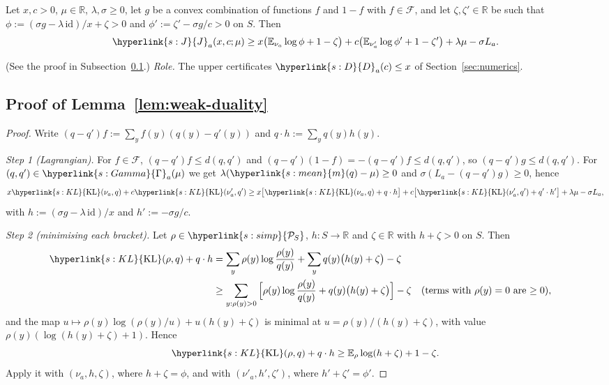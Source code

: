 \documentclass[11pt]{article}
\newcommand{\E}{\mathbb{E}}
\newcommand{\sy}[2]{{\hyperlink{#1}{#2}}}
\newcommand{\Simp}{\sy{s:simp}{\mathcal{P}_{S}}}
\newcommand{\mean}{\sy{s:mean}{m}}
\newcommand{\KL}{\sy{s:KL}{\mathrm{KL}}}
\newcommand{\Pairs}{\sy{s:Gamma}{\Gamma}}
\newcommand{\Jf}{\sy{s:J}{J}}
\newcommand{\Dc}{\sy{s:D}{D}}
\begin{document}
\begin{lemma}\label{lem:weak-duality}
Let $x,c>0$, $\mu\in\mathbb R$, $\lambda,\sigma\ge0$, let $g$ be a convex combination of functions
$f$ and $1-f$ with $f\in\mathcal F$, and let $\zeta,\zeta'\in\mathbb R$ be such that
$\phi:=(\sigma g-\lambda\,\mathrm{id})/x+\zeta>0$ and $\phi':=\zeta'-\sigma g/c>0$ on $S$. Then
\begin{equation*}
\Jf_a(x,c;\mu)\ge x\big(\E_{\nu_a}\log\phi+1-\zeta\big)+c\big(\E_{\nu'_a}\log\phi'+1-\zeta'\big)+\lambda\mu-\sigma L_a .
\end{equation*}
\end{lemma}

(See the proof in Subsection~\ref{sec:proof-lem-weak-duality}.) \emph{Role.} The upper certificates
$\Dc_a(c)\le x$ of Section~\ref{sec:numerics}.

\subsection{Proof of Lemma~\ref{lem:weak-duality}}\label{sec:proof-lem-weak-duality}

\begin{proof}
Write $(q-q')f:=\sum_yf(y)(q(y)-q'(y))$ and $q\cdot h:=\sum_yq(y)h(y)$.

\emph{Step 1 (Lagrangian).} For $f\in\mathcal F$, $(q-q')f\le d(q,q')$ and
$(q-q')(1-f)=-(q-q')f\le d(q,q')$, so $(q-q')g\le d(q,q')$. For $(q,q')\in\Pairs_a(\mu)$ we get
$\lambda(\mean(q)-\mu)\ge0$ and $\sigma(L_a-(q-q')g)\ge0$, hence
\begin{equation*}
x\KL(\nu_a,q)+c\KL(\nu'_a,q')\ge x\big[\KL(\nu_a,q)+q\cdot h\big]+c\big[\KL(\nu'_a,q')+q'\cdot h'\big]+\lambda\mu-\sigma L_a,
\end{equation*}
with $h:=(\sigma g-\lambda\,\mathrm{id})/x$ and $h':=-\sigma g/c$.

\emph{Step 2 (minimising each bracket).} Let $\rho\in\Simp$, $h:S\to\mathbb R$ and $\zeta\in\mathbb R$
with $h+\zeta>0$ on $S$. Then
\begin{align*}
\KL(\rho,q)+q\cdot h&=\sum_y\rho(y)\log\frac{\rho(y)}{q(y)}+\sum_yq(y)\big(h(y)+\zeta\big)-\zeta\\
&\ge\sum_{y:\rho(y)>0}\Big[\rho(y)\log\frac{\rho(y)}{q(y)}+q(y)\big(h(y)+\zeta\big)\Big]-\zeta
&& \text{(terms with $\rho(y)=0$ are $\ge0$)},
\end{align*}
and the map $u\mapsto\rho(y)\log(\rho(y)/u)+u(h(y)+\zeta)$ is minimal at $u=\rho(y)/(h(y)+\zeta)$,
with value $\rho(y)(\log(h(y)+\zeta)+1)$. Hence
\begin{equation*}
\KL(\rho,q)+q\cdot h\ge\E_\rho\log(h+\zeta)+1-\zeta .
\end{equation*}
Apply it with $(\nu_a,h,\zeta)$, where $h+\zeta=\phi$, and with $(\nu'_a,h',\zeta')$, where
$h'+\zeta'=\phi'$.
\end{proof}
\end{document}
